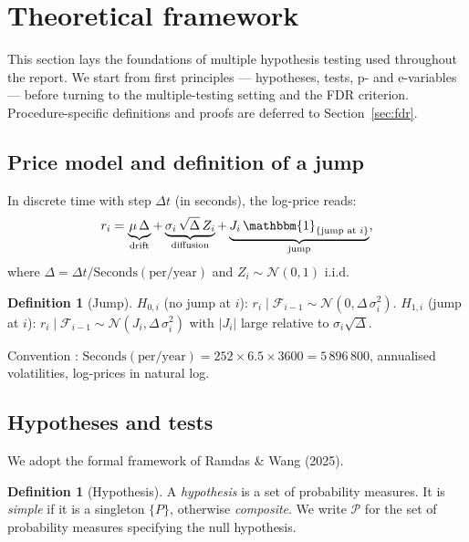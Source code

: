 \documentclass[11pt,a4paper,twocolumn]{article}
\theoremstyle{plain}
\theoremstyle{definition}
\newtheorem{definition}[theorem]{Definition}
\theoremstyle{remark}
\newcommand{\ind}{\mathbbm{1}}
\newcommand{\dt}{\Delta}
\begin{document}
\section{Theoretical framework}
\label{sec:theory}

This section lays the foundations of multiple hypothesis testing used
throughout the report. We start from first principles --- hypotheses, tests,
p- and e-variables --- before turning to the multiple-testing setting and the
FDR criterion. Procedure-specific definitions and proofs are deferred to
Section~\ref{sec:fdr}.

\subsection{Price model and definition of a jump}

In discrete time with step $\dt t$ (in seconds), the log-price reads:
\begin{equation}\label{eq:discrete}
  r_i = \underbrace{\mu\,\dt}_{\text{drift}}
      + \underbrace{\sigma_i\,\sqrt{\dt}\,Z_i}_{\text{diffusion}}
      + \underbrace{J_i\,\ind_{\{\text{jump at }i\}}}_{\text{jump}},
\end{equation}
where $\dt = \dt t / \mathrm{Seconds(per / year)}$ and $Z_i \sim \mathcal{N}(0,1)$
i.i.d.

\begin{definition}[Jump]
$H_{0,i}$ (no jump at $i$): $r_i \mid \mathcal{F}_{i-1} \sim \mathcal{N}(0, \dt\,\sigma_i^2)$.
$H_{1,i}$ (jump at $i$): $r_i \mid \mathcal{F}_{i-1} \sim \mathcal{N}(J_i, \dt\,\sigma_i^2)$
with $|J_i|$ large relative to $\sigma_i\sqrt{\dt}$.
\end{definition}

Convention : $\mathrm{Seconds(per / year)} = 252 \times 6.5 \times 3600 = 5\,896\,800$,
annualised volatilities, log-prices in natural log.

\subsection{Hypotheses and tests}

We adopt the formal framework of Ramdas \& Wang (2025).

\begin{definition}[Hypothesis]
A \emph{hypothesis} is a set of probability measures. It is \emph{simple} if
it is a singleton $\{P\}$, otherwise \emph{composite}. We write $\mathcal{P}$
for the set of probability measures specifying the null hypothesis.
\end{definition}
\end{document}
